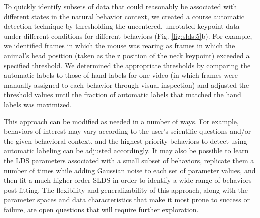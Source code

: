 To quickly identify subsets of data that could reasonably be associated with different states in the natural behavior context, we created a course automatic detection technique by thresholding the uncentered, unrotated keypoint data under different conditions for different behaviors (Fig. \ref{fig:slds:5}b). For example, we identified frames in which the mouse was rearing as frames in which the animal's head position (taken as the z position of the neck keypoint) exceeded a specified threshold. We determined the appropriate thresholds by comparing the automatic labels to those of hand labels for one video (in which frames were manually assigned to each behavior through visual inspection) and adjusted the threshold values until the fraction of automatic labels that matched the hand labels was maximized. 

This approach can be modified as needed in a number of ways. For example, behaviors of interest may vary according to the user's scientific questions and/or the given behavioral context, and the highest-priority behaviors to detect using automatic labeling can be adjusted accordingly. It may also be possible to learn the LDS parameters associated with a small subset of behaviors, replicate them a number of times while adding Gaussian noise to each set of parameter values, and then fit a much higher-order SLDS in order to identify a wide range of behaviors post-fitting. The flexibility and generalizability of this approach, along with the parameter spaces and data characteristics that make it most prone to success or failure, are open questions that will require further exploration.  